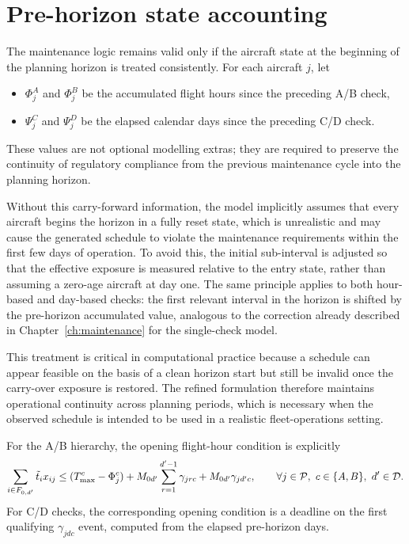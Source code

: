 \section{Pre-horizon state accounting}
\label{sec:hierarchy_prehorizon}

The maintenance logic remains valid only if the aircraft state at the beginning
of the planning horizon is treated consistently. For each aircraft $j$, let
\begin{itemize}
    \item $\Phi_j^{A}$ and $\Phi_j^{B}$ be the accumulated flight hours since the
    preceding A/B check,
    \item $\Psi_j^{C}$ and $\Psi_j^{D}$ be the elapsed calendar days since the
    preceding C/D check.
\end{itemize}
These values are not optional modelling extras; they are required to preserve the
continuity of regulatory compliance from the previous maintenance cycle into the
planning horizon.

Without this carry-forward information, the model implicitly assumes that every
aircraft begins the horizon in a fully reset state, which is unrealistic and may
 cause the generated schedule to violate the maintenance requirements within the
 first few days of operation. To avoid this, the initial sub-interval is adjusted
 so that the effective exposure is measured relative to the entry state, rather
 than assuming a zero-age aircraft at day one. The same principle applies to both
 hour-based and day-based checks: the first relevant interval in the horizon is
 shifted by the pre-horizon accumulated value, analogous to the correction already
 described in Chapter~\ref{ch:maintenance} for the single-check model.

This treatment is critical in computational practice because a schedule can appear
 feasible on the basis of a clean horizon start but still be invalid once the
 carry-over exposure is restored. The refined formulation therefore maintains
 operational continuity across planning periods, which is necessary when the
 observed schedule is intended to be used in a realistic fleet-operations setting.

For the A/B hierarchy, the opening flight-hour condition is explicitly
\begin{equation}
    \sum_{i\in F_{0,d'}}\tilde t_i x_{ij}
    \leq (T_{\max}^{c}-\Phi_j^c)
    +M_{0d'}\sum_{r=1}^{d'-1}\gamma_{jrc}
    +M_{0d'}\gamma_{jd'c},
    \qquad \forall j\in\mathcal{P},\ c\in\{A,B\},\ d'\in\mathcal{D}.
    \label{eq:c13b_initial_hier}
\end{equation}
For C/D checks, the corresponding opening condition is a deadline on the first
qualifying $\gamma_{jdc}$ event, computed from the elapsed pre-horizon days.

